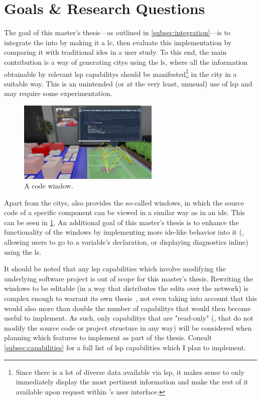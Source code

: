 \documentclass[../thesis]{subfiles}
\begin{document}
\section{Goals \& Research Questions}\label{sec:goals}
The goal of this master's thesis---as outlined in \cref{subsec:integration}---is to integrate the  into \SEE{} by making it a \gls{lc}, then evaluate this implementation by comparing it with traditional \glspl{ide} in a user study.
To this end, the main contribution is a way of generating \glspl{city} using the \gls{ls}, where all the information obtainable by relevant \gls{lsp} \glspl{capability} should be manifested\footnote{
	Since there is a lot of diverse data available via \gls{lsp}, it makes sense to only immediately display the most pertinent information and make the rest of it available upon request within \SEE{}'s user interface.
} in the city in a suitable way.
This is an unintended (or at the very least, unusual) use of \gls{lsp} and may require some experimentation.

\begin{figure}
	\centering
	\includegraphics[width=0.6\textwidth,trim={30.5cm 22cm 6cm 0},clip]{../figures/SEE_readme}
	\caption{A code window.}\label{fig:window}
\end{figure}

Apart from the \glspl{city}, \SEE{} also provides the so-called \glspl*{window}, in which the source code of a specific component can be viewed in a similar way as in an \gls{ide}.
This can be seen in \cref{fig:window}.
An additional goal of this master's thesis is to enhance the functionality of the \glspl{window} by implementing more \gls{ide}-like behavior into it (\eg, allowing users to go to a variable's declaration, or displaying diagnostics inline) using the \gls{ls}.

It should be noted that any \gls{lsp} capabilities which involve modifying the underlying software project is out of scope for this master's thesis.
Rewriting the \glspl{window} to be editable (in a way that distributes the edits over the network) is complex enough to warrant its own thesis~\cite[see also][]{moritz}, not even taking into account that this would also more than double the number of \glspl{capability} that would then become useful to implement.
As such, only \glspl{capability} that are "read-only" (\ie, that do not modify the source code or project structure in any way) will be considered when planning which features to implement as part of the thesis.
Consult \cref{subsec:capabilities} for a full list of \gls{lsp} capabilities which I plan to implement.
\end{document}
